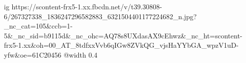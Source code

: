  
 
 
 
 

\ifcmt
  ig https://scontent-frx5-1.xx.fbcdn.net/v/t39.30808-6/267327338_1836247296582883_6321504401177224682_n.jpg?_nc_cat=105&ccb=1-5&_nc_sid=b9115d&_nc_ohc=AQ78s8UXdasAX9cEhwz&_nc_ht=scontent-frx5-1.xx&oh=00_AT_8tdfxxVvb6qIGw8ZVkQG_vjsHaYYbGA_wpzV1uD-yfw&oe=61C20456
  @width 0.4
\fi
